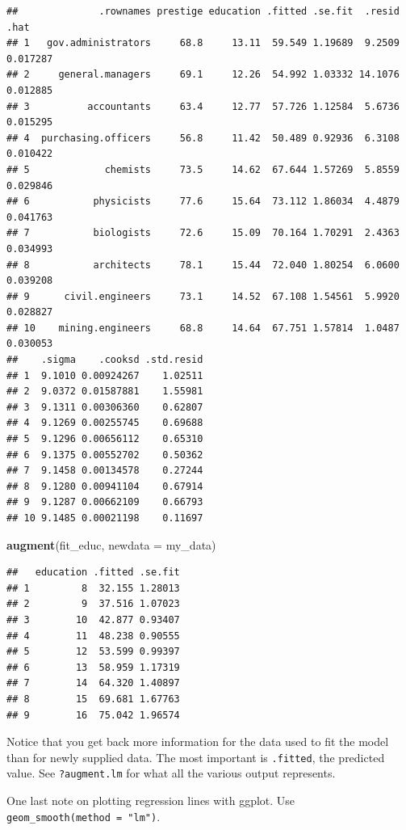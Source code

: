 \documentclass[12pt,oneside,openany]{book}
\newenvironment{Shaded}{\begin{snugshade}}{\end{snugshade}}
\newcommand{\KeywordTok}[1]{\textcolor[rgb]{0.13,0.29,0.53}{\textbf{{#1}}}}
\newcommand{\DataTypeTok}[1]{\textcolor[rgb]{0.13,0.29,0.53}{{#1}}}
\newcommand{\NormalTok}[1]{{#1}}
\begin{document}
\begin{verbatim}
##              .rownames prestige education .fitted .se.fit  .resid     .hat
## 1   gov.administrators     68.8     13.11  59.549 1.19689  9.2509 0.017287
## 2     general.managers     69.1     12.26  54.992 1.03332 14.1076 0.012885
## 3          accountants     63.4     12.77  57.726 1.12584  5.6736 0.015295
## 4  purchasing.officers     56.8     11.42  50.489 0.92936  6.3108 0.010422
## 5             chemists     73.5     14.62  67.644 1.57269  5.8559 0.029846
## 6           physicists     77.6     15.64  73.112 1.86034  4.4879 0.041763
## 7           biologists     72.6     15.09  70.164 1.70291  2.4363 0.034993
## 8           architects     78.1     15.44  72.040 1.80254  6.0600 0.039208
## 9      civil.engineers     73.1     14.52  67.108 1.54561  5.9920 0.028827
## 10    mining.engineers     68.8     14.64  67.751 1.57814  1.0487 0.030053
##    .sigma    .cooksd .std.resid
## 1  9.1010 0.00924267    1.02511
## 2  9.0372 0.01587881    1.55981
## 3  9.1311 0.00306360    0.62807
## 4  9.1269 0.00255745    0.69688
## 5  9.1296 0.00656112    0.65310
## 6  9.1375 0.00552702    0.50362
## 7  9.1458 0.00134578    0.27244
## 8  9.1280 0.00941104    0.67914
## 9  9.1287 0.00662109    0.66793
## 10 9.1485 0.00021198    0.11697
\end{verbatim}

\begin{Shaded}
\begin{Highlighting}[]
\KeywordTok{augment}\NormalTok{(fit_educ,}
        \DataTypeTok{newdata =} \NormalTok{my_data)}
\end{Highlighting}
\end{Shaded}

\begin{verbatim}
##   education .fitted .se.fit
## 1         8  32.155 1.28013
## 2         9  37.516 1.07023
## 3        10  42.877 0.93407
## 4        11  48.238 0.90555
## 5        12  53.599 0.99397
## 6        13  58.959 1.17319
## 7        14  64.320 1.40897
## 8        15  69.681 1.67763
## 9        16  75.042 1.96574
\end{verbatim}

Notice that you get back more information for the data used to fit the
model than for newly supplied data. The most important is
\texttt{.fitted}, the predicted value. See \texttt{?augment.lm} for what
all the various output represents.

One last note on plotting regression lines with ggplot. Use
\texttt{geom\_smooth(method\ =\ "lm")}.
\end{document}
